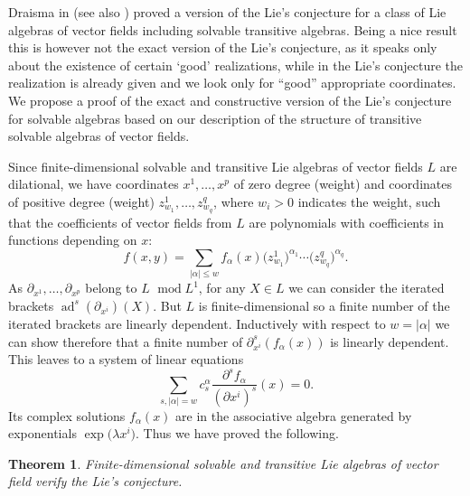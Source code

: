 \documentclass[pdftex]{sigma}
\numberwithin{equation}{section}
\newtheorem{Theorem}{Theorem}[section]
\begin{document}
Draisma in \cite{Draisma02a} (see also \cite{Draisma02}) proved a version of the Lie's conjecture for a class of Lie algebras of vector fields including solvable transitive algebras. Being a nice result this is however not the exact version of the Lie's conjecture, as it speaks only about the existence of certain `good' realizations, while in the Lie's conjecture the realization is already given and we look only for ``good'' appropriate coordinates. We propose a proof of the exact and constructive version of the Lie's conjecture for solvable algebras based on our description of the structure of transitive solvable algebras of vector fields.

Since finite-dimensional solvable and transitive Lie algebras of vector fields $L$ are dilational, we have
coordinates $x^1,\dots,x^p$ of zero degree (weight) and coordinates of positive degree (weight) $z^1_{w_1},\dots,z^q_{w_q}$, where $w_i>0$ indicates the weight, such that the coefficients of vector fields from $L$
are polynomials with coefficients in functions depending on $x$:
\[ f(x,y)=\sum_{|\alpha|\le w}f_\alpha(x)\big(z_{w_1}^1\big)^{\alpha_1}\cdots \big(z_{w_q}^q\big)^{\alpha_q} .\]
As $\partial_{x^1},\dots,\partial_{x^p}$ belong to $L$ $\operatorname{mod} L^1$, for any $X\in L$ we can consider the iterated brackets
$\operatorname{ad}^s(\partial_{x^i})(X)$. But $L$ is finite-dimensional so a finite number of the iterated brackets are linearly dependent. Inductively with respect to $w=|\alpha|$ we can show therefore that a finite number of
$\partial^s_{x^i}(f_\alpha(x))$ is linearly dependent. This leaves to a system of linear equations
\[ \sum_{s,|\alpha|=w} c_s^\alpha\frac{\partial^s f_\alpha}{(\partial x^i)^s}(x)=0 .\]
Its complex solutions $f_\alpha(x)$ are in the associative algebra generated by exponentials $\exp\big(\lambda x^i\big)$.
Thus we have proved the following.
\begin{Theorem}
Finite-dimensional solvable and transitive Lie algebras of vector field verify the Lie's conjecture.
\end{Theorem}
\end{document}
